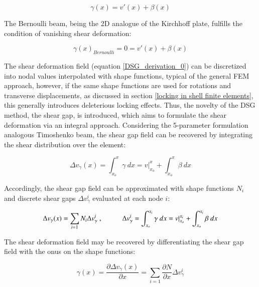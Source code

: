 \begin{equation} 
\gamma(x) = v'(x) + \beta(x)
\label{DSG_derivation_0}
\end{equation}

The Bernoulli beam, being the 2D analogue of the Kirchhoff plate, fulfills the condition of vanishing shear deformation:

\begin{equation} 
\gamma(x)_{Bernoulli} = 0 = v'(x) + \beta(x)
\label{DSG_derivation_1}
\end{equation}

The shear deformation field (equation \ref{DSG_derivation_0}) can be discretized into nodal values interpolated with shape functions, typical of the general FEM approach, however, if the same shape functions are used for rotations and transverse displacements, as discussed in section \ref{locking in shell finite elements}, this generally introduces deleterious locking effects. Thus, the novelty of the DSG method, the shear gap, is introduced, which aims to formulate the shear deformation via an integral approach. Considering the 5-parameter formulation analogous Timoshenko beam, the shear gap field can be recovered by integrating the shear distribution over the element:

\begin{equation} 
\Delta v_\gamma(x) 
= \int_{x_o}^x \gamma \ dx
= v |_{x_o}^x +  \int_{x_o}^x \beta \ dx
\label{DSG_derivation_2}
\end{equation}

Accordingly, the shear gap field can be approximated with shape functions $N_i$ and discrete shear gaps $ \Delta v_{\gamma}^i$ evaluated at each node $i$:

\begin{equation} 
\Delta v_\gamma(x) = \sum_{i=1} N_i \Delta v_{\gamma}^i\ ,
\hspace{10mm} 
\Delta v_\gamma^i 
= \int_{x_o}^{x_i} \gamma \ dx
= v |_{x_o}^{x_i} +  \int_{x_o}^{x_i} \beta \ dx
\label{DSG_derivation_3}
\end{equation}

The shear deformation field may be recovered by differentiating the shear gap field with the onus on the shape functions:

\begin{equation} 
\gamma(x) = \frac{\partial \Delta v_\gamma(x) }{\partial x}
=  \sum_{i=1} \frac{\partial N}{\partial x}\Delta v_{\gamma}^i
\label{DSG_derivation_4}
\end{equation}


